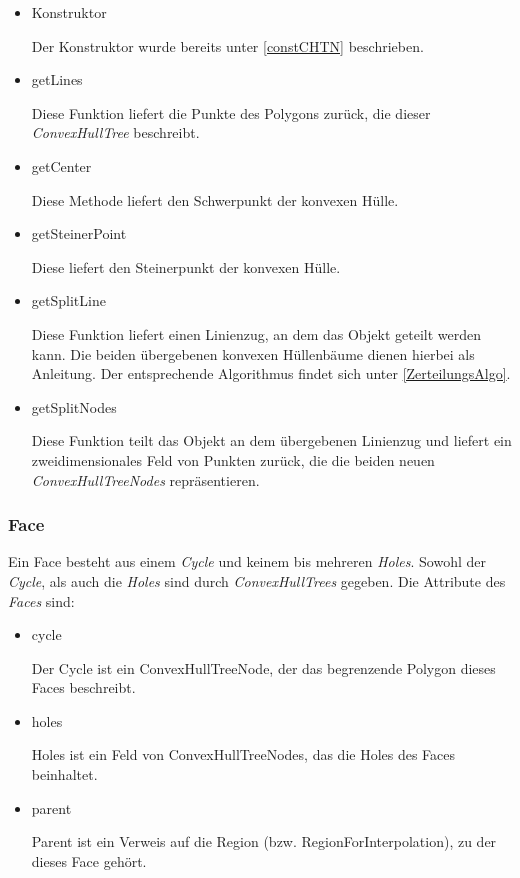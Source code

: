 \begin{itemize}
\item Konstruktor

Der Konstruktor wurde bereits unter \vref{constCHTN} beschrieben.

\item getLines

Diese Funktion liefert die Punkte des Polygons zurück, die dieser \textit{ConvexHullTree} beschreibt.

\item getCenter

Diese Methode liefert den Schwerpunkt der konvexen Hülle.

\item getSteinerPoint

Diese liefert den Steinerpunkt der konvexen Hülle.

\item getSplitLine

Diese Funktion liefert einen Linienzug, an dem das Objekt geteilt werden kann. Die beiden übergebenen konvexen Hüllenbäume dienen hierbei als Anleitung. Der entsprechende Algorithmus findet sich unter \vref{ZerteilungsAlgo}.

\item getSplitNodes

Diese Funktion teilt das Objekt an dem übergebenen Linienzug und liefert ein zweidimensionales Feld von Punkten zurück, die die beiden neuen \textit{ConvexHullTreeNodes} repräsentieren.  

\end{itemize}


\subsubsection{Face}

Ein Face besteht aus einem \textit{Cycle} und keinem bis mehreren \textit{Holes}. Sowohl der \textit{Cycle}, als auch die \textit{Holes} sind durch \textit{ConvexHullTrees} gegeben. Die Attribute des \textit{Faces} sind:

\begin{itemize}
\item cycle

Der Cycle ist ein ConvexHullTreeNode, der das begrenzende Polygon dieses Faces beschreibt.

\item holes

Holes ist ein Feld von ConvexHullTreeNodes, das die Holes des Faces beinhaltet.

\item parent

Parent ist ein Verweis auf die Region (bzw. RegionForInterpolation), zu der dieses Face gehört.

\end{itemize}

